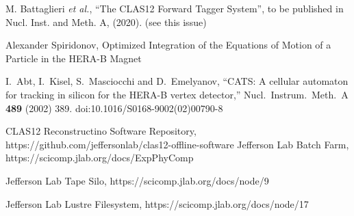 \documentclass[3p,times,twocolumn]{elsarticle}
\begin{document}
\begin{thebibliography}{99}
M. Battaglieri {\it et al.}, ``The CLAS12 Forward Tagger System'', to be published in Nucl. Inst. and
Meth. A, (2020). (see this issue)

Alexander Spiridonov, Optimized Integration of the Equations of Motion of a Particle in the HERA-B Magnet

I.~Abt, I.~Kisel, S.~Masciocchi and D.~Emelyanov,
``CATS: A cellular automaton for tracking in silicon for the HERA-B vertex detector,''
Nucl.\ Instrum.\ Meth.\ A {\bf 489} (2002) 389.
doi:10.1016/S0168-9002(02)00790-8

{CLAS12 Reconstructino Software Repository},
https://github.com/jeffersonlab/clas12-offline-software
{Jefferson Lab Batch Farm},
https://scicomp.jlab.org/docs/ExpPhyComp

{Jefferson Lab Tape Silo},
https://scicomp.jlab.org/docs/node/9

{Jefferson Lab Lustre Filesystem},
https://scicomp.jlab.org/docs/node/17

\end{thebibliography}
\end{document}
